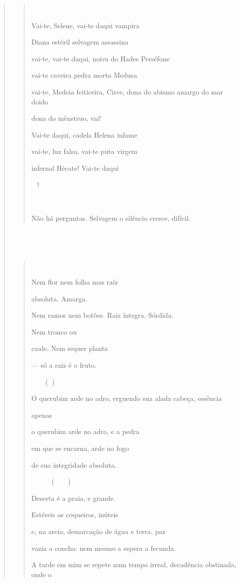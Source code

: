 \begin{verse}
\begin{quote}


Vai-te, Selene, vai-te daqui vampira

Diana estéril selvagem assassina

vai-te, vai-te daqui, noiva do Hades Perséfone

vai-te caveira pedra morta Medusa

vai-te, Medeia feiticeira, Circe, dona do abismo amargo do mar doido

dona do mênstruo, vai!

Vai-te daqui, cadela Helena infame

vai-te, luz falsa, vai-te puta virgem

infernal Hécate! Vai-te daqui

!



Não há perguntas. Selvagem o silêncio cresce, difícil.
\end{quote}

\subsection{}\label{section-8}

\begin{quote}


Nem flor nem folha mas raíz

absoluta. Amarga.

Nem ramos nem botões. Raiz íntegra. Sórdida.

Nem tronco ou

caule. Nem sequer planta

--- só a raiz é o fruto.

 ()

O querubim arde no adro, erguendo sua alada cabeça, essência

apenas

o querubim arde no adro, e a pedra

em que se encarna, arde no fogo

de sua integridade absoluta.

  ()

Deserta é a praia, e grande.

Estéreis os coqueiros, inúteis

e, na areia, demarcação de água e terra, paz

vazia a concha: nem mesmo a espera a fecunda.

A tarde em mim se repete num tempo irreal, decadência obstinada, onde o


\end{quote}
\end{verse}
